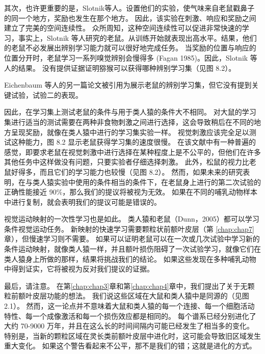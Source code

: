 其次，也许更重要的是，Slotnik等人。设置他们的实验，使气味来自老鼠戳鼻子的同一个地方，奖励也发生在那个地方。
因此，该实验在刺激、响应和奖励之间建立了完美的空间连续性。
众所周知，这种空间连续性可以促进非常快速的学习\cite{cowey1968varying}，事实上，Slotnik 等人研究的老鼠。从训练开始就表现出高水平。结果，他们的老鼠不必发展出辨别学习能力就可以很好地完成任务。
当奖励的位置与响应的位置分开时，老鼠学习一系列嗅觉辨别会慢得多 (Fagan 1985)。因此，Slotnik 等人的结果。
没有提供证据证明猕猴可以获得哪种辨别学习集（见图 8.2）。
\par


Eichenbaum 等人的另一篇论文\cite{eichenbaum1986normal}被引用为展示老鼠的辨别学习集，但它没有提到关键试验，试验二的表现。
\par


因此，在学习集上测试老鼠的条件与用于类人猿的条件大不相同。
对大鼠的学习集进行适当的测试需要在两种非食物刺激之间进行选择，这会导致稍后在不同的地方呈现奖励，就像在类人猿中进行的学习集实验一样。
视觉刺激应该完全足以测试这种能力，图 8.2 显示老鼠获得学习集的速度很慢。
在该文献中有一种普遍的感觉，即要求老鼠在视觉刺激中进行选择在某种程度上是不公平的，但他们在许多其他任务中这样做没有问题，只要实验者仔细选择刺激\cite{bussey2008touchscreen}。
此外，松鼠的视力比老鼠好得多，而且它们的学习能力也较慢（见图 8.2）。
然而，如果未来的研究表明，在与类人猿实验中使用的条件相当的条件下，在老鼠身上进行的第二次试验的正确性能接近 90$\%$，那么我们的提议将被视为无效。
如果在不同的哺乳动物样本中进行复制，就会表明我们的提议可能是错误的。
\par


视觉运动映射的一次性学习也是如此。
类人猿和老鼠\cite{dumont2007functional}（Dunn，2005）都可以学习条件视觉运动任务。
新映射的快速学习需要颗粒状前额叶皮层（第 \ref{chap:chap7} 章），但慢速学习则不需要\cite{bussey2001role}。
如果可以证明老鼠可以在一次或几次试验中学习新的条件运动映射，就像类人猿一样，并且额叶损伤阻碍了一次试验学习，就像它们在类人猿身上所做的那样，结果将挑战我们的结论。
如果这些发现在多种哺乳动物中得到证实，它将被视为反对我们提议的证据。
\par


最后，请注意。
在第\ref{chap:chap3}章和第\ref{chap:chap4}章中，我们提出了关于无颗粒前额叶皮层功能的想法。
我们说这些区域在大鼠和类人猿中是同源的（见图 2.1）。
然而，这一论点并不意味着大鼠和类人猿的每一个连接、每一个细胞活动特性、每一个成像激活和每一个损伤效应都是相同的。
每个谱系已经分别进化了大约 70-9000 万年，并且在这么长的时间间隔内可能已经发生了相当多的变化。
特别是，当新的颗粒区域在灵长类前额叶皮层中进化时，这可能会导致旧区域发生重大变化。
如果这个警告看起来不公平，那不是我们的错；这就是进化的方式。



